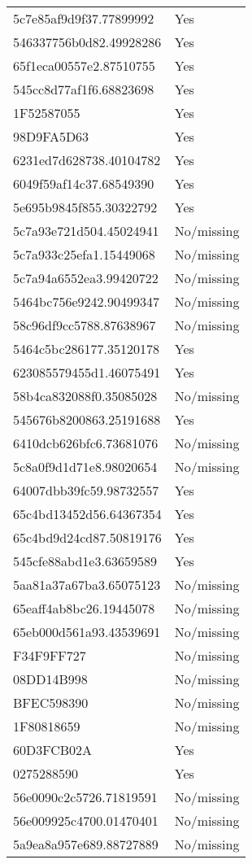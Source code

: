 \begin{tabular}{ll}
5c7e85af9d9f37.77899992 & Yes \\
546337756b0d82.49928286 & Yes \\
65f1eca00557e2.87510755 & Yes \\
545cc8d77af1f6.68823698 & Yes \\
1F52587055 & Yes \\
98D9FA5D63 & Yes \\
6231ed7d628738.40104782 & Yes \\
6049f59af14c37.68549390 & Yes \\
5e695b9845f855.30322792 & Yes \\
5c7a93e721d504.45024941 & No/missing \\
5c7a933c25efa1.15449068 & No/missing \\
5c7a94a6552ea3.99420722 & No/missing \\
5464bc756e9242.90499347 & No/missing \\
58c96df9cc5788.87638967 & No/missing \\
5464c5bc286177.35120178 & Yes \\
623085579455d1.46075491 & Yes \\
58b4ca832088f0.35085028 & No/missing \\
545676b8200863.25191688 & Yes \\
6410dcb626bfc6.73681076 & No/missing \\
5c8a0f9d1d71e8.98020654 & No/missing \\
64007dbb39fc59.98732557 & Yes \\
65c4bd13452d56.64367354 & Yes \\
65c4bd9d24cd87.50819176 & Yes \\
545cfe88abd1e3.63659589 & Yes \\
5aa81a37a67ba3.65075123 & No/missing \\
65eaff4ab8bc26.19445078 & No/missing \\
65eb000d561a93.43539691 & No/missing \\
F34F9FF727 & No/missing \\
08DD14B998 & No/missing \\
BFEC598390 & No/missing \\
1F80818659 & No/missing \\
60D3FCB02A & Yes \\
0275288590 & Yes \\
56e0090c2c5726.71819591 & No/missing \\
56e009925c4700.01470401 & No/missing \\
5a9ea8a957e689.88727889 & No/missing \\

\end{tabular}
